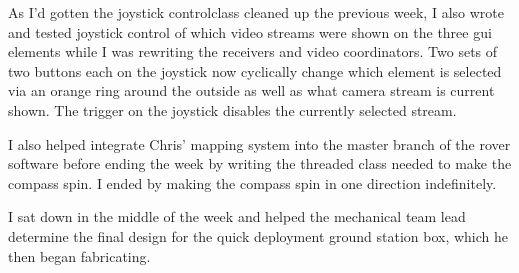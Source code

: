 \begin{itemize}
\begin{itemize}
\begin{itemize}
As I'd gotten the joystick controlclass cleaned up the previous week, I also wrote and tested joystick control of which video streams were shown on the three gui elements while I was rewriting the receivers and video coordinators. Two sets of two buttons each on the joystick now cyclically change which element is selected via an orange ring around the outside as well as what camera stream is current shown. The trigger on the joystick disables the currently selected stream. 

I also helped integrate Chris' mapping system into the master branch of the rover software before ending the week by writing the threaded class needed to make the compass spin. I ended by making the compass spin in one direction indefinitely. 

I sat down in the middle of the week and helped the mechanical team lead determine the final design for the quick deployment ground station box, which he then began fabricating. 
      \end{itemize}
	\end{itemize}


\end{itemize}
